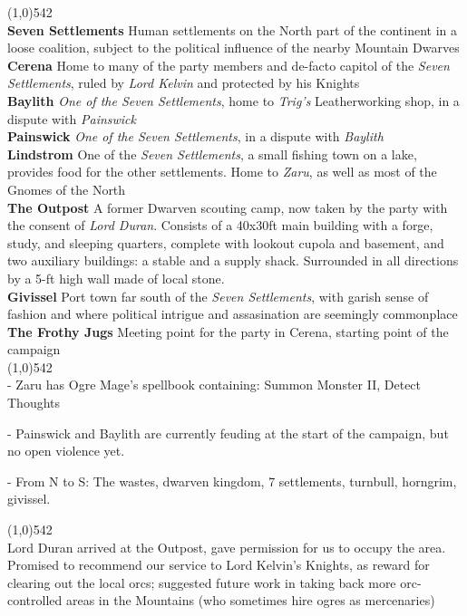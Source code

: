 \documentclass[letterpaper]{article}
\newcommand{\fullline}{\noindent\line(1,0){542} \\}
\begin{document}
\vspace{-1.75em}
\fullline
\textbf{Seven Settlements} Human settlements on the North part of the continent in a loose coalition, subject to the political influence of the nearby Mountain Dwarves \\
\textbf{Cerena} Home to many of the party members and de-facto capitol of the \emph{Seven Settlements}, ruled by \emph{Lord Kelvin} and protected by his Knights \\
\textbf{Baylith} \emph{One of the Seven Settlements}, home to \emph{Trig's} Leatherworking shop, in a dispute with \emph{Painswick} \\
\textbf{Painswick} \emph{One of the Seven Settlements}, in a dispute with \emph{Baylith} \\
\textbf{Lindstrom} One of the \emph{Seven Settlements}, a small fishing town on a lake, provides food for the other settlements.  Home to \emph{Zaru}, as well as most of the Gnomes of the North \\
\textbf{The Outpost} A former Dwarven scouting camp, now taken by the party with the consent of \emph{Lord Duran}.  Consists of a 40x30ft main building with a forge, study, and sleeping quarters, complete with lookout cupola and basement, and two auxiliary buildings: a stable and a supply shack. Surrounded in all directions by a 5-ft high wall made of local stone. \\
\textbf{Givissel} Port town far south of the \emph{Seven Settlements}, with garish sense of fashion and where political intrigue and assasination are seemingly commonplace \\
\textbf{The Frothy Jugs} Meeting point for the party in Cerena, starting point of the campaign\\

\vspace{-1.75em}
\fullline
\noindent - Zaru has Ogre Mage's spellbook containing: Summon Monster II, Detect Thoughts

\noindent - Painswick and Baylith are currently feuding at the start of the campaign, but no open violence yet.

\noindent - From N to S: The wastes, dwarven kingdom, 7 settlements, turnbull, horngrim, givissel.

\vspace{-0.75em}
\fullline
\noindent Lord Duran arrived at the Outpost, gave permission for us to occupy the area. Promised to recommend our service to Lord Kelvin's Knights, as reward for clearing out the local orcs; suggested future work in taking back more orc-controlled areas in the Mountains (who sometimes hire ogres as mercenaries)\\
\end{document}
